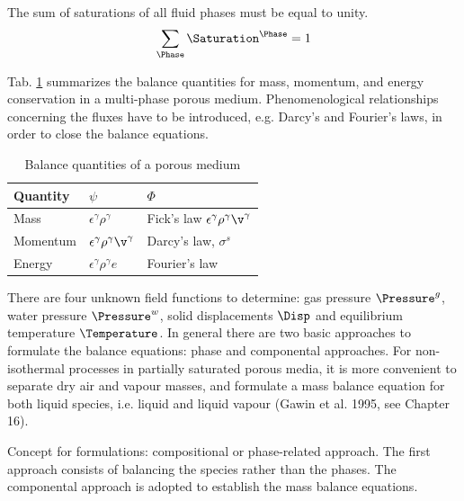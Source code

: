 The sum of saturations of all fluid phases must be equal to unity.
\begin{eqnarray}
\sum_\Phase \Saturation^\Phase = 1
\end{eqnarray}

Tab. \ref{tab:conservation_quantities_pm} summarizes the balance quantities for mass, momentum, and energy conservation in a multi-phase porous medium. Phenomenological relationships concerning the fluxes have to be introduced, e.g. Darcy's and Fourier's laws, in order to close the balance equations.

%
\begin{table}[htb!]
\caption{Balance quantities of a porous medium}
\label{tab:conservation_quantities_pm}
\begin{center}
\begin{tabular}{|l||l|l|}
\hline
Quantity & $\psi$                                  & $\Phi$ \\
\hline
\hline
Mass     & $\epsilon^\gamma \rho^\gamma$           & Fick's law $\epsilon^\gamma \rho^\gamma \v^\gamma$ \\
\hline
Momentum & $\epsilon^\gamma \rho^\gamma \v^\gamma$ & Darcy's law, $\sigma^s$ \\
\hline
Energy   & $\epsilon^\gamma \rho^\gamma e$         & Fourier's law \\
\hline
\end{tabular}
\end{center}
\end{table}
%

There are four unknown field functions to determine:
gas pressure $\Pressure^g$,
water pressure $\Pressure^w$,
solid displacements $\Disp$ and
equilibrium temperature $\Temperature$.
%
In general there are two basic approaches to formulate the balance equations: phase and componental approaches.
%
For non-isothermal processes in partially saturated porous media,
it is more convenient to separate
dry air and vapour masses,
and formulate a mass balance equation for both liquid species,
i.e. liquid and liquid vapour (Gawin et al. 1995, see Chapter 16).

Concept for formulations:
compositional or phase-related approach.
The first approach consists of balancing the species
rather than the phases.
The componental approach is adopted to establish the mass balance equations.

